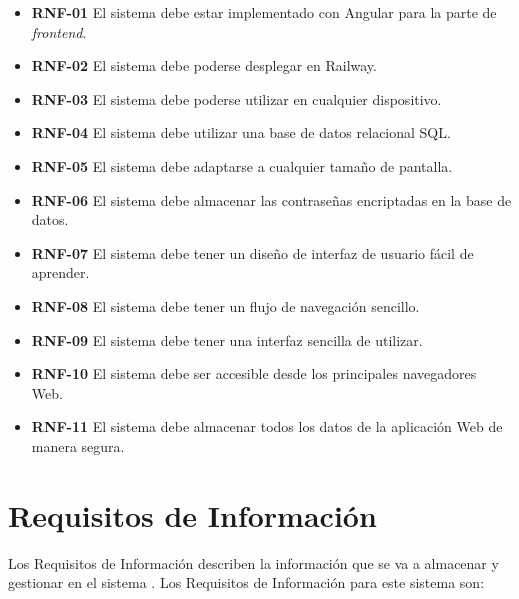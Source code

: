 \begin{itemize}
    
\item \textbf{RNF-01} El sistema debe estar implementado con Angular para la parte de \textit{frontend}.
\item \textbf{RNF-02} El sistema debe poderse desplegar en Railway.
\item \textbf{RNF-03} El sistema debe poderse utilizar en cualquier dispositivo.
\item \textbf{RNF-04} El sistema debe utilizar una base de datos relacional SQL.
\item \textbf{RNF-05} El sistema debe adaptarse a cualquier tamaño de pantalla.
\item \textbf{RNF-06 }El sistema debe almacenar las contraseñas encriptadas en la base de datos.
\item \textbf{RNF-07} El sistema debe tener un diseño de interfaz de usuario fácil de aprender.
\item \textbf{RNF-08} El sistema debe tener un flujo de navegación sencillo.
\item \textbf{RNF-09} El sistema debe tener una interfaz sencilla de utilizar.
\item \textbf{RNF-10} El sistema debe ser accesible desde los principales navegadores Web.
\item \textbf{RNF-11} El sistema debe almacenar todos los datos de la aplicación Web de manera segura.

\end{itemize}


\section{Requisitos de Información}



Los Requisitos de Información describen la información que se va a almacenar y gestionar en el sistema \cite{requisitos-informacion}. Los Requisitos de Información para este sistema son: 

